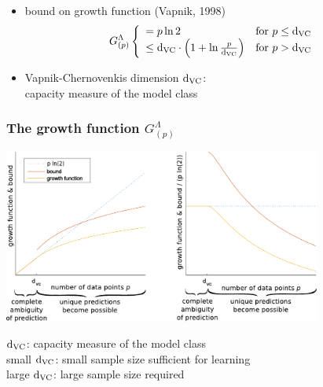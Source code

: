 \begin{frame}
	\begin{itemize}
		\item bound on growth function (Vapnik, 1998)
			\begin{equation}
				G_{(p)}^\Lambda
				\left \{ \begin{array}{ll}
					= p \ln 2 
					& \text{for } p \leq \mathrm{d}_{\mathrm{VC}} \\
					\leq \mathrm{d}_{\mathrm{VC}} \cdot \Big( 1 + \ln \frac{p}{\mathrm{d}_{\mathrm{VC}}} \Big) 
					& \text{for } p > \mathrm{d}_{\mathrm{VC}}
				\end{array} \right.
			\label{eq:growthpiecewise}
			\end{equation}

		\item Vapnik-Chernovenkis dimension $\mathrm{d}_{\mathrm{VC}}$: \\
			capacity measure of the model class
	\end{itemize}
\end{frame}

\begin{frame}\frametitle{The growth function $G_{(p)}^\Lambda$}
	\begin{center}
		\includegraphics[height=5.7cm]{img/growth_function_clean}
	\end{center}
	\vspace{-2mm}
	$\mathrm{d}_{\mathrm{VC}}$: capacity measure of the model class\\
	small $\mathrm{d}_{\mathrm{VC}}$: small sample size sufficient for learning\\
	large $\mathrm{d}_{\mathrm{VC}}$: large sample size required

\end{frame}



